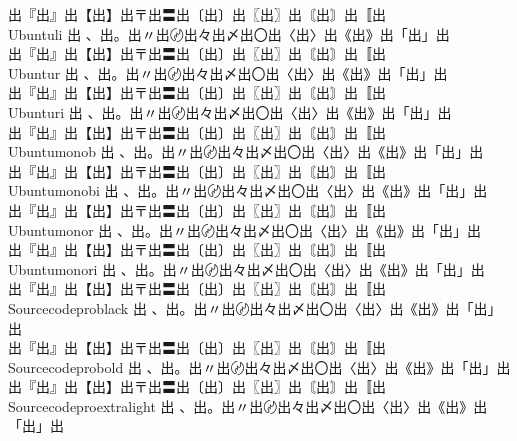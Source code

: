 \begin{tabbing}
\> {\mktsFontfileUbuntul{}出『出』出【出】出〒出〓出〔出〕出〖出〗出〘出〙出〚出} \\
Ubuntuli \> {\mktsFontfileUbuntuli{}出 、出。出〃出〄出々出〆出〇出〈出〉出《出》出「出」出}\\
\> {\mktsFontfileUbuntuli{}出『出』出【出】出〒出〓出〔出〕出〖出〗出〘出〙出〚出} \\
Ubuntur \> {\mktsFontfileUbuntur{}出 、出。出〃出〄出々出〆出〇出〈出〉出《出》出「出」出}\\
\> {\mktsFontfileUbuntur{}出『出』出【出】出〒出〓出〔出〕出〖出〗出〘出〙出〚出} \\
Ubunturi \> {\mktsFontfileUbunturi{}出 、出。出〃出〄出々出〆出〇出〈出〉出《出》出「出」出}\\
\> {\mktsFontfileUbunturi{}出『出』出【出】出〒出〓出〔出〕出〖出〗出〘出〙出〚出} \\
Ubuntumonob \> {\mktsFontfileUbuntumonob{}出 、出。出〃出〄出々出〆出〇出〈出〉出《出》出「出」出}\\
\> {\mktsFontfileUbuntumonob{}出『出』出【出】出〒出〓出〔出〕出〖出〗出〘出〙出〚出} \\
Ubuntumonobi \> {\mktsFontfileUbuntumonobi{}出 、出。出〃出〄出々出〆出〇出〈出〉出《出》出「出」出}\\
\> {\mktsFontfileUbuntumonobi{}出『出』出【出】出〒出〓出〔出〕出〖出〗出〘出〙出〚出} \\
Ubuntumonor \> {\mktsFontfileUbuntumonor{}出 、出。出〃出〄出々出〆出〇出〈出〉出《出》出「出」出}\\
\> {\mktsFontfileUbuntumonor{}出『出』出【出】出〒出〓出〔出〕出〖出〗出〘出〙出〚出} \\
Ubuntumonori \> {\mktsFontfileUbuntumonori{}出 、出。出〃出〄出々出〆出〇出〈出〉出《出》出「出」出}\\
\> {\mktsFontfileUbuntumonori{}出『出』出【出】出〒出〓出〔出〕出〖出〗出〘出〙出〚出} \\
Sourcecodeproblack \> {\mktsFontfileSourcecodeproblack{}出 、出。出〃出〄出々出〆出〇出〈出〉出《出》出「出」出}\\
\> {\mktsFontfileSourcecodeproblack{}出『出』出【出】出〒出〓出〔出〕出〖出〗出〘出〙出〚出} \\
Sourcecodeprobold \> {\mktsFontfileSourcecodeprobold{}出 、出。出〃出〄出々出〆出〇出〈出〉出《出》出「出」出}\\
\> {\mktsFontfileSourcecodeprobold{}出『出』出【出】出〒出〓出〔出〕出〖出〗出〘出〙出〚出} \\
Sourcecodeproextralight \> {\mktsFontfileSourcecodeproextralight{}出 、出。出〃出〄出々出〆出〇出〈出〉出《出》出「出」出}\\

\end{tabbing}

